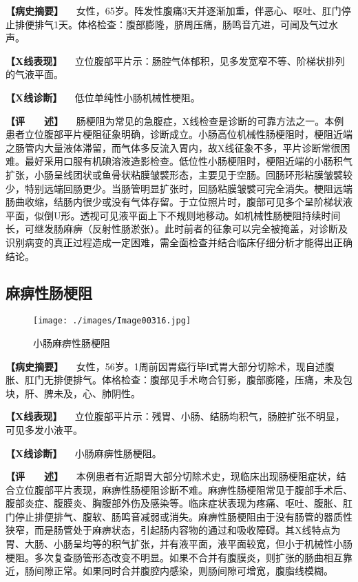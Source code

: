 \textbf{【病史摘要】}
　女性，65岁。阵发性腹痛3天并逐渐加重，伴恶心、呕吐、肛门停止排便排气1天。体格检查：腹部膨隆，脐周压痛，肠鸣音亢进，可闻及气过水声。

\textbf{【X线表现】}
　立位腹部平片示：肠腔气体郁积，见多发宽窄不等、阶梯状排列的气液平面。

\textbf{【X线诊断】} 　低位单纯性小肠机械性梗阻。

\textbf{【评　　述】}
　肠梗阻为常见的急腹症，X线检查是诊断的可靠方法之一。本例患者立位腹部平片梗阻征象明确，诊断成立。小肠高位机械性肠梗阻时，梗阻近端之肠管内大量液体滞留，而气体多反流入胃内，故X线征象不多，平片诊断常很困难。最好采用口服有机碘溶液造影检查。低位性小肠梗阻时，梗阻近端的小肠积气扩张，小肠呈线团状或鱼骨状粘膜皱襞形态，主要见于空肠。回肠环形粘膜皱襞较少，特别远端回肠更少。当肠管明显扩张时，回肠粘膜皱襞可完全消失。梗阻远端肠曲收缩，结肠内很少或没有气体存留。于立位照片时，腹部可见多个呈阶梯状液平面，似倒U形。透视可见液平面上下不规则地移动。如机械性肠梗阻持续时间长，可继发肠麻痹（反射性肠淤张）。此时前者的征象可以完全被掩盖，对诊断及识别病变的真正过程造成一定困难，需全面检查并结合临床仔细分析才能得出正确结论。

\subsection{麻痹性肠梗阻}

\begin{figure}[!htbp]
 \centering
 \texttt{[image: ./images/Image00316.jpg]}
 \captionsetup{justification=centering}
 \caption{小肠麻痹性肠梗阻}
 \label{fig5-7-3}
  \end{figure} 

\textbf{【病史摘要】}
　女性，56岁。1周前因胃癌行毕Ⅰ式胃大部分切除术，现自述腹胀、肛门无排便排气。体格检查：腹部见手术吻合钉影，腹部膨隆，压痛，未及包块，肝、脾未及，心、肺阴性。

\textbf{【X线表现】}
　立位腹部平片示：残胃、小肠、结肠均积气，肠腔扩张不明显，可见多发小液平。

\textbf{【X线诊断】} 　小肠麻痹性肠梗阻。

\textbf{【评　　述】}
　本例患者有近期胃大部分切除术史，现临床出现肠梗阻症状，结合立位腹部平片表现，麻痹性肠梗阻诊断不难。麻痹性肠梗阻常见于腹部手术后、腹部炎症、腹膜炎、胸腹部外伤及感染等。临床症状表现为疼痛、呕吐、腹胀、肛门停止排便排气、腹软、肠鸣音减弱或消失。麻痹性肠梗阻由于没有肠管的器质性狭窄，而是肠管处于麻痹状态，引起肠内容物的通过和吸收障碍。其X线特点为胃、大肠、小肠呈均等的积气扩张，并有液平面，液平面较宽，但小于机械性小肠梗阻。多次复查肠管形态改变不明显。如果不合并有腹膜炎，则扩张的肠曲相互靠近，肠间隙正常。如果同时合并腹腔内感染，则肠间隙可增宽，腹脂线模糊。

